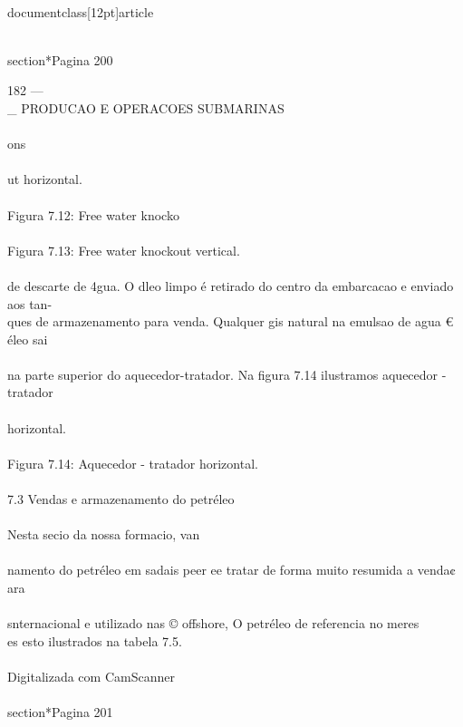 \\documentclass[12pt]{article}
\begin{document}
\\section*{Pagina 200}

182 —\\_ PRODUCAO E OPERACOES SUBMARINAS\\
\\
ons\\
\\
ut horizontal.\\
\\
Figura 7.12: Free water knocko\\
\\
Figura 7.13: Free water knockout vertical.\\
\\
de descarte de 4gua. O dleo limpo é retirado do centro da embarcacao e enviado aos tan-\\
ques de armazenamento para venda. Qualquer gis natural na emulsao de agua € éleo sai\\
\\
na parte superior do aquecedor-tratador. Na figura 7.14 ilustramos aquecedor - tratador\\
\\
horizontal.\\
\\
Figura 7.14: Aquecedor - tratador horizontal.\\
\\
7.3 Vendas e armazenamento do petréleo\\
\\
Nesta secio da nossa formacio, van\\
\\
namento do petréleo em sadais peer ee tratar de forma muito resumida a venda¢ ara\\
\\
snternacional e utilizado nas © offshore, O petréleo de referencia no meres\\
es esto ilustrados na tabela 7.5.\\
\\
Digitalizada com CamScanner\\

\\section*{Pagina 201}
\end{document}
